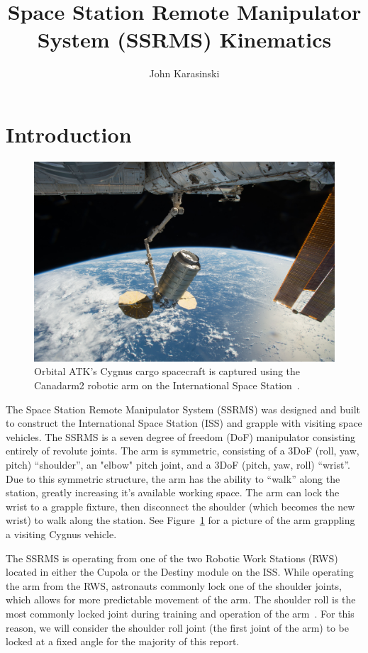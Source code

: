 \documentclass{article}
\author{John Karasinski}
\title{Space Station Remote Manipulator System (SSRMS) Kinematics}
\begin{document}
\maketitle
\tableofcontents
\clearpage

\section{Introduction}

\begin{figure}[b!]
\includegraphics[width=\textwidth]{ssrms.jpg}
\caption{Orbital ATK's Cygnus cargo spacecraft is captured using the Canadarm2 robotic arm on the International Space Station~\cite{ssrms_cc}.}
\label{ssrms_image}
\end{figure}

The Space Station Remote Manipulator System (SSRMS) was designed and built to construct the International Space Station (ISS) and grapple with visiting space vehicles.
The SSRMS is a seven degree of freedom (DoF) manipulator consisting entirely of revolute joints.
The arm is symmetric, consisting of a 3DoF (roll, yaw, pitch) ``shoulder'', an "elbow" pitch joint, and a 3DoF (pitch, yaw, roll) ``wrist''.
Due to this symmetric structure, the arm has the ability to ``walk'' along the station, greatly increasing it's available working space.
The arm can lock the wrist to a grapple fixture, then disconnect the shoulder (which becomes the new wrist) to walk along the station.
See Figure~\ref{ssrms_image} for a picture of the arm grappling a visiting Cygnus vehicle.

The SSRMS is operating from one of the two Robotic Work Stations (RWS) located in either the Cupola or the Destiny module on the ISS.
While operating the arm from the RWS, astronauts commonly lock one of the shoulder joints, which allows for more predictable movement of the arm.
The shoulder roll is the most commonly locked joint during training and operation of the arm~\cite{astro_emails}.
For this reason, we will consider the shoulder roll joint (the first joint of the arm) to be locked at a fixed angle for the majority of this report.
\end{document}
